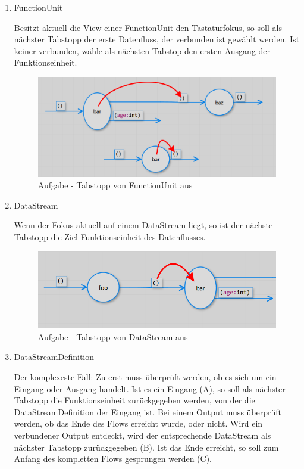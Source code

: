 \begin{enumerate}
	\item FunctionUnit
	
	Besitzt aktuell die View einer FunctionUnit den Tastaturfokus, so soll als
	nächster Tabstopp der erste Datenfluss, der verbunden ist gewählt werden. Ist keiner
	verbunden, wähle als nächsten Tabstop den ersten Ausgang der Funktionseinheit.
	
	\begin{figure}[H]
		\centering
		\includegraphics[width=0.6\linewidth]{./img/tabstop_functionunit.png}
		\caption{Aufgabe - Tabstopp von FunctionUnit aus}
	\end{figure}
	
	\item DataStream
	
	Wenn der Fokus aktuell auf einem DataStream liegt, so ist der nächste Tabstopp die Ziel-Funktionseinheit des Datenflusses.
	
	\begin{figure}[H]
		\centering
		\includegraphics[width=0.6\linewidth]{./img/tabstop_datastream.png}
		\caption{Aufgabe - Tabstopp von DataStream aus}
	\end{figure}
	
	\item DataStreamDefinition
	
	Der komplexeste Fall: 
	Zu erst muss überprüft werden, ob es sich um ein Eingang oder Ausgang
	handelt. Ist es ein Eingang (A), so soll als nächster Tabstopp die Funktionseinheit
	zurückgegeben werden, von der die DataStreamDefinition der Eingang ist. 
	Bei einem Output muss überprüft werden, ob das Ende des Flows erreicht
	wurde, oder nicht. Wird ein verbundener Output entdeckt, wird der
	entsprechende DataStream als nächster Tabstopp zurückgegeben (B). Ist das Ende
	erreicht, so soll zum Anfang des kompletten Flows gesprungen werden (C).
	

\end{enumerate}
